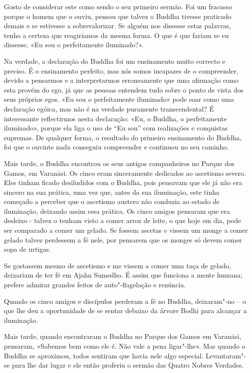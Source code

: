 \enlargethispage{\baselineskip}

Gosto de considerar este como sendo o seu primeiro sermão. Foi um fracasso
porque o homem que o ouviu, pensou que talvez o Buddha tivesse praticado demais e se
estivesse a sobrevalorizar. Se alguém nos dissesse estas palavras, tenho a
certeza que reagiríamos da mesma forma. O que é que fariam se eu dissesse, «Eu
sou o perfeitamente iluminado?».

Na verdade, a declaração do Buddha foi um ensinamento muito correcto e preciso.
É o ensinamento perfeito, mas nós somos incapazes de o compreender, devido a
pensarmos e a interpretarmos erroneamente que uma afirmação como esta provém do ego,
já que as pessoas entendem tudo sobre o ponto de vista dos seus próprios egos.
«Eu sou o perfeitamente iluminado» pode soar como uma declaração egóica, mas não
é na verdade puramente transcendental? É interessante reflectirmos nesta declaração: 
«Eu, o Buddha, o perfeitamente iluminado», porque ela liga o uso de
“Eu sou” com realizações e conquistas supremas. De qualquer forma, o resultado
do primeiro ensinamento do Buddha, foi que o ouvinte nada conseguiu compreender
e continuou no seu caminho.

\enlargethispage{\baselineskip}

Mais tarde, o Buddha encontrou os seus antigos companheiros no Parque dos
Gamos, em Varanāsi. Os cinco eram sinceramente dedicados ao ascetismo severo.
Eles tinham ficado desiludidos com o Buddha, pois pensavam que ele já não era
sincero na sua prática, uma vez que, antes da sua iluminação, este tinha começado a
perceber que o ascetismo austero não conduzia ao estado de iluminação, deixando assim essa prática. 
Os cinco amigos pensaram que era desleixo - talvez o tenham
visto a comer arroz de leite, o que hoje em dia, pode ser comparado a comer um
gelado. Se fossem ascetas e vissem um monge a comer gelado talvez perdessem a fé
nele, por pensarem que os monges só devem comer sopa de urtigas.

Se gostassem mesmo de ascetismo e me vissem a comer uma taça de gelado,
deixariam de ter fé em Ajahn Sumedho. É assim que funciona a mente humana;
prefere admirar grandes feitos de auto"-flagelação e renúncia.

Quando os cinco amigos e discípulos perderam a fé no Buddha, deixaram"-no – o que
lhe deu a oportunidade de se sentar debaixo da árvore Bodhi para alcançar a
iluminação.

Mais tarde, quando encontraram o Buddha no Parque dos Gamos em Varanāsi,
pensaram, «Sabemos bem como ele é. Não vale a pena ligar"-lhe». Mas quando o
Buddha se aproximou, todos sentiram que havia nele algo especial. Levantaram"-se
para lhe dar lugar e ele então proferiu o sermão das Quatro Nobres Verdades.

